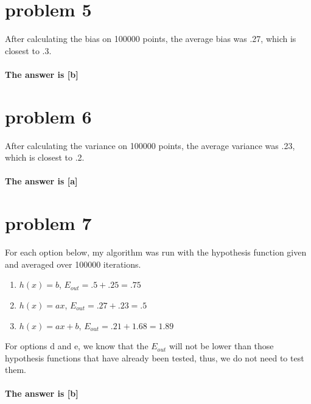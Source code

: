 \documentclass{article}
\begin{document}
\section*{problem 5}
After calculating the bias on 100000 points, the average bias was .27, which is closest to .3.\\\\
\textbf{The answer is [b]}

\section*{problem 6}
After calculating the variance on 100000 points, the average variance was .23, which is closest to .2.\\\\
\textbf{The answer is [a]}

\section*{problem 7}
For each option below, my algorithm was run with the hypothesis function given and averaged over 100000 iterations. 
\begin{enumerate}[label=(\alph*)]
    \item $h(x) = b$, $E_{out} = .5 + .25 = .75$
    \item $h(x) = ax$, $E_{out} = .27 + .23 = .5$
    \item $h(x) = ax + b$, $E_{out} = .21 + 1.68 = 1.89$
\end{enumerate}
For options d and e, we know that the $E_{out}$ will not be lower than those hypothesis functions that have already been tested, thus, we do not need to test them.\\\\
\textbf{The answer is [b]}
\end{document}
